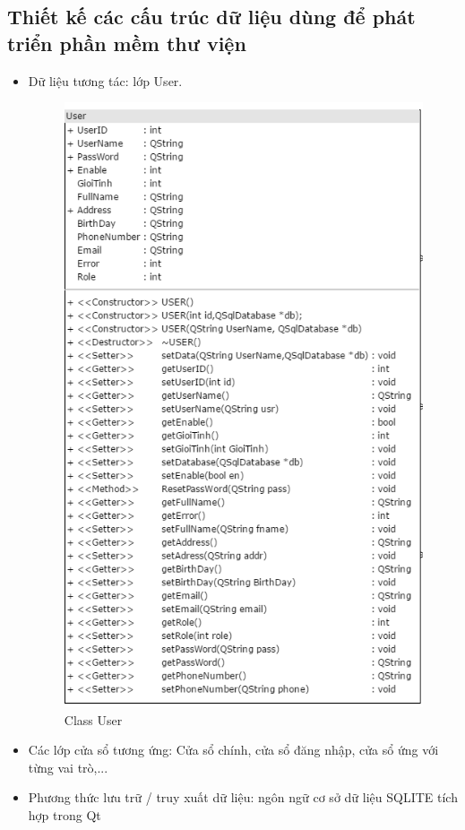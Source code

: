 \documentclass[a4paper]{article}
\begin{document}
\subsection{Thiết kế các cấu trúc dữ liệu dùng để phát triển phần mềm thư viện}
\begin{itemize}
	\item Dữ liệu tương tác: lớp User.\\
	\begin{figure}[h!]
	\begin{center}
		\includegraphics[scale=.8]{Diagram_User.png}
		\caption{Class User}
	\end{center}
	\end{figure}
	\newpage \newpage 
	\item Các lớp cửa sổ tương ứng: Cửa sổ chính, cửa sổ đăng nhập, cửa sổ ứng với từng vai trò,...
	\item Phương thức lưu trữ / truy xuất dữ liệu: ngôn ngữ cơ sở dữ liệu SQLITE tích hợp trong Qt
\end{itemize}
\end{document}
